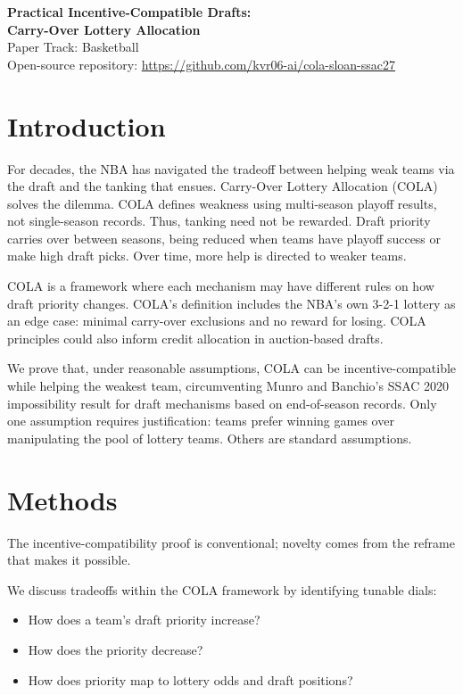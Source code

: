 \documentclass[10pt]{article}
\begin{document}
\begin{center}
{\Large\bfseries Practical Incentive-Compatible Drafts:\\[2pt] Carry-Over Lottery Allocation}\\[4pt]
{\normalsize Paper Track: Basketball}\\[2pt]
{\small Open-source repository: \url{https://github.com/kvr06-ai/cola-sloan-ssac27}}
\end{center}

\section{Introduction}

For decades, the NBA has navigated the tradeoff between helping weak teams via the draft and the tanking that ensues. Carry-Over Lottery Allocation (COLA) solves the dilemma. COLA defines weakness using multi-season playoff results, not single-season records. Thus, tanking need not be rewarded. Draft priority carries over between seasons, being reduced when teams have playoff success or make high draft picks. Over time, more help is directed to weaker teams. 

COLA is a framework where each mechanism may have different rules on how draft priority changes. COLA's definition includes the NBA's own 3-2-1 lottery as an edge case: minimal carry-over exclusions and no reward for losing. COLA principles could also inform credit allocation in auction-based drafts. 

We prove that, under reasonable assumptions, COLA can be incentive-compatible while helping the weakest team, circumventing Munro and Banchio's SSAC 2020 impossibility result for draft mechanisms based on end-of-season records. Only one assumption requires justification: teams prefer winning games over manipulating the pool of lottery teams. Others are standard assumptions.

\section{Methods}

The incentive-compatibility proof is conventional; novelty comes from the reframe that makes it possible.

We discuss tradeoffs within the COLA framework by identifying tunable dials:
\begin{itemize}
\item How does a team's draft priority increase?
\item How does the priority decrease?
\item How does priority map to lottery odds and draft positions?
\end{itemize}
\end{document}
